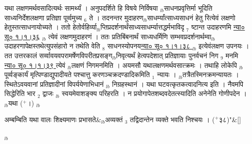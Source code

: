 \documentclass[article,12pt,a4paper]{memoir}%
\newcommand{\add}[1]{($^{+}$#1)}
\newcounter{parCount}
\begin{document}
	  
	  \pstart \leavevmode%
	यथा लक्षणमर्थवसादित्यर्थः सामर्थ्यं । अनुपदर्शिते हि विषये निर्विषया {\tiny $_{lb}$}साधनप्रवृत्तिर्मा भूदिति साध्यनिर्देशलक्षणा प्रतिज्ञा पूर्व्वमुच्य {\tiny $_{6}$} ते । तदनन्तर मुदाहरण{\tiny $_{lb}$}साधर्म्यांत्साध्यसाधनं हेतु रित्येवं लक्षणो हेतुस्तत्साधनायोच्यते । ततो हेतोर्वहिर्व्या{\tiny $_{lb}$}प्तिप्रदर्शनार्थंसाध्यसाधर्म्यात्तद्धर्मभाविदृ {\tiny $_{7}$} ष्टान्त उदाहरणमि \href{http://sarit.indology.info/?cref=ns\%C5\%AB.1.1.36}{न्या० सू० १।१।३६} {\tiny $_{lb}$} त्येवं लक्षणमुदाहरणं । ततः प्रतिबिंबनार्थं साध्यधर्मिणि सम्भवप्रदर्शनार्थम्वा{\tiny $_{lb}$}उदाहरणापेक्षस्तथेत्युपसंहारो न तथेति वेति {\tiny $_{8}$} साधनस्योपनय\href{http://sarit.indology.info/?cref=ns\%C5\%AB.1.1.38}{न्या० सू० १।१।३८ } {\tiny $_{lb}$} इत्येवंलक्षण उपनयः । तत उत्तरकालं सर्व्वावयवपरामर्षेणविपरीतप्रसङ्ग{\tiny $_{lb}$}निवृत्यर्थं हेत्वपदेशात् प्रतिज्ञायाः पुनर्वचनं निग {\tiny $_{9}$} \leavevmode{} मनमि \href{http://sarit.indology.info/?cref=ns\%C5\%AB.1.1.39}{न्या० सू० १।१।३९ } त्येवं {\tiny $_{lb}$}लक्षणं निगमनमिति । अयमसौ यथालक्षणमर्थवसात्क्रमः । तथाहि लोकेपि {\tiny $_{lb}$}पूर्व्वङ्कार्यं मृत्पिण्डाद्युपादीयते पश्चात्तु करणञ्चक्रदण्डादिकमिति {\tiny $_{1}$} न्यायः । {\tiny $_{lb}$}तत्रैतस्मिनक्रमन्यायतः । स्थितेऽवयवानां प्रतिज्ञादीनां विपर्ययेणाभिधानं {\tiny $_{lb}$} \leavevmode{} निग्रहस्थानं । यथा घटवत्कृतकत्वादनित्य इति । नैवमपि सिद्धेरिति {\color{DodgerBlue3}भार {\tiny $_{2}$} द्वाजः} {\tiny $_{lb}$} स्वयमेवाशङ्क्य परिहरति । {\color{DodgerBlue3}न प्रयोगापेतशब्दवदेतत्स्यादिति} अनेनेति गोणीपदेन । {\tiny $_{lb}$}यथा \add{।}
	{}
	\pend%
      {\tiny $_{lb}$}
	  \bigskip
	  \begingroup
	
	    
	    \stanza[\smallbreak]
	  अम्बम्बिति यथा वालः शिक्ष्यमाणः प्रभासते&{\tiny $_{lb}$}अव्यक्तं {\tiny $_{3}$} तद्विदान्तेन व्यक्ते भवति निश्चयः । \add{३८}{\normalfontlatin\large\qquad{}"}\&[\smallbreak]
	  
	  
	  
	  \endgroup
	{\tiny $_{lb}$}
\end{document}
